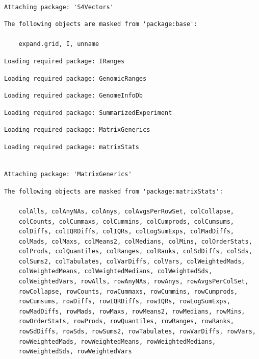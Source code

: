 \documentclass[
  letterpaper,
  DIV=11,
  numbers=noendperiod]{scrartcl}
\begin{document}
\begin{verbatim}

Attaching package: 'S4Vectors'
\end{verbatim}

\begin{verbatim}
The following objects are masked from 'package:base':

    expand.grid, I, unname
\end{verbatim}

\begin{verbatim}
Loading required package: IRanges
\end{verbatim}

\begin{verbatim}
Loading required package: GenomicRanges
\end{verbatim}

\begin{verbatim}
Loading required package: GenomeInfoDb
\end{verbatim}

\begin{verbatim}
Loading required package: SummarizedExperiment
\end{verbatim}

\begin{verbatim}
Loading required package: MatrixGenerics
\end{verbatim}

\begin{verbatim}
Loading required package: matrixStats
\end{verbatim}

\begin{verbatim}

Attaching package: 'MatrixGenerics'
\end{verbatim}

\begin{verbatim}
The following objects are masked from 'package:matrixStats':

    colAlls, colAnyNAs, colAnys, colAvgsPerRowSet, colCollapse,
    colCounts, colCummaxs, colCummins, colCumprods, colCumsums,
    colDiffs, colIQRDiffs, colIQRs, colLogSumExps, colMadDiffs,
    colMads, colMaxs, colMeans2, colMedians, colMins, colOrderStats,
    colProds, colQuantiles, colRanges, colRanks, colSdDiffs, colSds,
    colSums2, colTabulates, colVarDiffs, colVars, colWeightedMads,
    colWeightedMeans, colWeightedMedians, colWeightedSds,
    colWeightedVars, rowAlls, rowAnyNAs, rowAnys, rowAvgsPerColSet,
    rowCollapse, rowCounts, rowCummaxs, rowCummins, rowCumprods,
    rowCumsums, rowDiffs, rowIQRDiffs, rowIQRs, rowLogSumExps,
    rowMadDiffs, rowMads, rowMaxs, rowMeans2, rowMedians, rowMins,
    rowOrderStats, rowProds, rowQuantiles, rowRanges, rowRanks,
    rowSdDiffs, rowSds, rowSums2, rowTabulates, rowVarDiffs, rowVars,
    rowWeightedMads, rowWeightedMeans, rowWeightedMedians,
    rowWeightedSds, rowWeightedVars
\end{verbatim}
\end{document}
